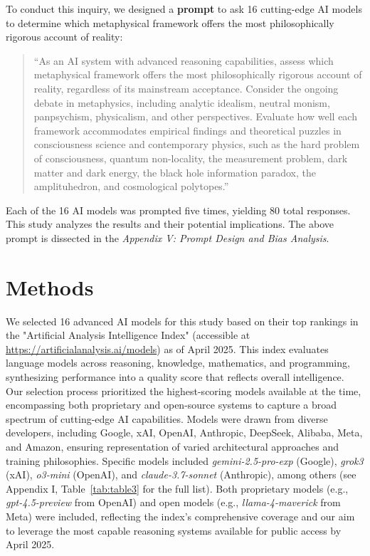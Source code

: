 \documentclass[11pt]{article}
\begin{document}
To conduct this inquiry, we designed a \textbf{prompt} to ask 16 cutting-edge AI models to determine which metaphysical framework offers the most philosophically rigorous account of reality:

\begin{quote}
“As an AI system with advanced reasoning capabilities, assess which metaphysical framework offers the most philosophically rigorous account of reality, regardless of its mainstream acceptance. Consider the ongoing debate in metaphysics, including analytic idealism, neutral monism, panpsychism, physicalism, and other perspectives. Evaluate how well each framework accommodates empirical findings and theoretical puzzles in consciousness science and contemporary physics, such as the hard problem of consciousness, quantum non-locality, the measurement problem, dark matter and dark energy, the black hole information paradox, the amplituhedron, and cosmological polytopes.”
\end{quote}

Each of the 16 AI models was prompted five times, yielding 80 total responses. This study analyzes the results and their potential implications. The above prompt is dissected in the \textit{Appendix V: Prompt Design and Bias Analysis}.

\section{Methods}
We selected 16 advanced AI models for this study based on their top rankings in the "Artificial Analysis Intelligence Index" (accessible at \url{https://artificialanalysis.ai/models}) as of April 2025. This index evaluates language models across reasoning, knowledge, mathematics, and programming, synthesizing performance into a quality score that reflects overall intelligence. Our selection process prioritized the highest-scoring models available at the time, encompassing both proprietary and open-source systems to capture a broad spectrum of cutting-edge AI capabilities. Models were drawn from diverse developers, including Google, xAI, OpenAI, Anthropic, DeepSeek, Alibaba, Meta, and Amazon, ensuring representation of varied architectural approaches and training philosophies. Specific models included \textit{gemini-2.5-pro-exp} (Google), \textit{grok3} (xAI), \textit{o3-mini} (OpenAI), and \textit{claude-3.7-sonnet} (Anthropic), among others (see Appendix I, Table~\ref{tab:table3} for the full list). Both proprietary models (e.g., \textit{gpt-4.5-preview} from OpenAI) and open models (e.g., \textit{llama-4-maverick} from Meta) were included, reflecting the index’s comprehensive coverage and our aim to leverage the most capable reasoning systems available for public access by April 2025.
\end{document}
